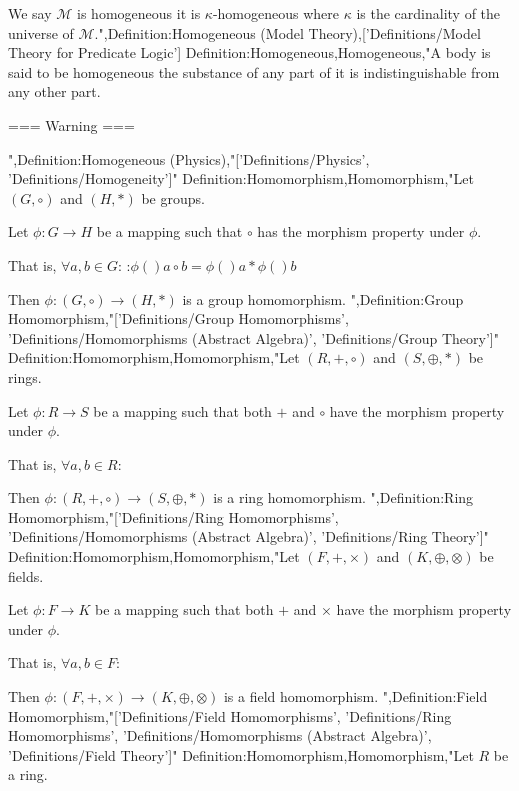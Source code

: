 We say $\mathcal M$ is homogeneous  it is $\kappa$-homogeneous where $\kappa$ is the cardinality of the universe of $\mathcal M$.",Definition:Homogeneous (Model Theory),['Definitions/Model Theory for Predicate Logic']
Definition:Homogeneous,Homogeneous,"A body is said to be homogeneous  the substance of any part of it is indistinguishable from any other part.


=== Warning ===

",Definition:Homogeneous (Physics),"['Definitions/Physics', 'Definitions/Homogeneity']"
Definition:Homomorphism,Homomorphism,"Let $\left( G, \circ \right)$ and $\left( H, * \right)$ be groups.

Let $\phi: G \to H$ be a mapping such that $\circ$ has the morphism property under $\phi$.


That is, $\forall a, b \in G$:
:$\phi \left(   \right){a \circ b} = \phi \left(   \right)a * \phi \left(   \right)b$


Then $\phi: \left( G, \circ \right) \to \left( H, * \right)$ is a group homomorphism.
",Definition:Group Homomorphism,"['Definitions/Group Homomorphisms', 'Definitions/Homomorphisms (Abstract Algebra)', 'Definitions/Group Theory']"
Definition:Homomorphism,Homomorphism,"Let $\left( R, +, \circ \right)$ and $\left( S, \oplus, * \right)$ be rings.

Let $\phi: R \to S$ be a mapping such that both $+$ and $\circ$ have the morphism property under $\phi$.


That is, $\forall a, b \in R$:







Then $\phi: \left( R, +, \circ \right) \to \left( S, \oplus, * \right)$ is a ring homomorphism.
",Definition:Ring Homomorphism,"['Definitions/Ring Homomorphisms', 'Definitions/Homomorphisms (Abstract Algebra)', 'Definitions/Ring Theory']"
Definition:Homomorphism,Homomorphism,"Let $\left( F, +, \times \right)$ and $\left( K, \oplus, \otimes \right)$ be fields.

Let $\phi: F \to K$ be a mapping such that both $+$ and $\times$ have the morphism property under $\phi$.


That is, $\forall a, b \in F$:







Then $\phi: \left( F, +, \times \right) \to \left( K, \oplus, \otimes \right)$ is a field homomorphism.
",Definition:Field Homomorphism,"['Definitions/Field Homomorphisms', 'Definitions/Ring Homomorphisms', 'Definitions/Homomorphisms (Abstract Algebra)', 'Definitions/Field Theory']"
Definition:Homomorphism,Homomorphism,"Let $R$ be a ring.

